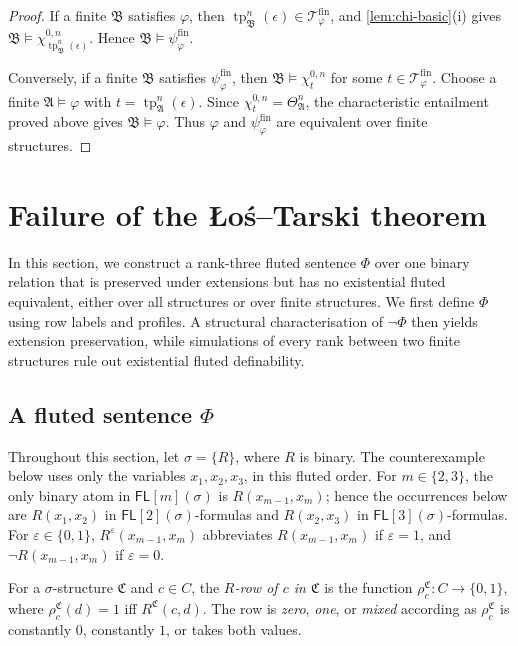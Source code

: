 \documentclass{lmcs}
\newcommand{\FL}{\mathsf{FL}}
\newcommand{\tp}{\operatorname{tp}}
\newcommand{\A}{\mathfrak{A}}
\newcommand{\B}{\mathfrak{B}}
\newcommand{\C}{\mathfrak{C}}
\begin{document}
\begin{proof}
If a finite $\B$ satisfies $\varphi$, then
$\tp_{\B}^{n}(\epsilon)\in\mathcal T_{\varphi}^{\mathrm{fin}}$, and
\cref{lem:chi-basic}(i) gives
$\B\models\chi_{\tp_{\B}^{n}(\epsilon)}^{0,n}$.  Hence
$\B\models\psi_{\varphi}^{\mathrm{fin}}$.

Conversely, if a finite $\B$ satisfies $\psi_{\varphi}^{\mathrm{fin}}$, then
$\B\models\chi_t^{0,n}$ for some
$t\in\mathcal T_{\varphi}^{\mathrm{fin}}$.  Choose a finite
$\A\models\varphi$ with $t=\tp_{\A}^{n}(\epsilon)$.  Since
$\chi_t^{0,n}=\Theta_{\A}^{n}$, the characteristic entailment proved above
gives $\B\models\varphi$.  Thus $\varphi$ and
$\psi_{\varphi}^{\mathrm{fin}}$ are equivalent over finite structures.
\end{proof}

\section{Failure of the \L o\'s--Tarski theorem}\label{sec:los-tarski}

In this section, we construct a rank-three fluted sentence $\Phi$ over one
binary relation that is preserved under extensions but has no existential
fluted equivalent, either over all structures or over finite structures.  We
first define $\Phi$ using row labels and profiles.  A structural
characterisation of $\neg\Phi$ then yields extension preservation, while
simulations of every rank between two finite structures rule out existential
fluted definability.

\subsection{A fluted sentence \texorpdfstring{\(\Phi\)}{Phi}}
\label{sec:counterexample-formula}

Throughout this section, let \(\sigma=\{R\}\), where \(R\) is binary.  The
counterexample below uses only the variables
\(x_1,x_2,x_3\), in this fluted order.  For
\(m\in\{2,3\}\), the only binary atom in \(\FL[m](\sigma)\) is
\(R(x_{m-1},x_m)\); hence the occurrences below are \(R(x_1,x_2)\) in
\(\FL[2](\sigma)\)-formulas and \(R(x_2,x_3)\) in
\(\FL[3](\sigma)\)-formulas.  For \(\varepsilon\in\{0,1\}\),
\(R^\varepsilon(x_{m-1},x_m)\) abbreviates \(R(x_{m-1},x_m)\) if
\(\varepsilon=1\), and \(\neg R(x_{m-1},x_m)\) if \(\varepsilon=0\).

For a \(\sigma\)-structure \(\C\) and \(c\in C\), the
\emph{\(R\)-row of \(c\) in \(\C\)} is the function
\(\rho_c^\C:C\to\{0,1\}\), where \(\rho_c^\C(d)=1\) iff
\(R^\C(c,d)\).  The row is \emph{zero}, \emph{one}, or \emph{mixed}
according as \(\rho_c^\C\) is constantly \(0\), constantly \(1\), or takes
both values.
\end{document}

